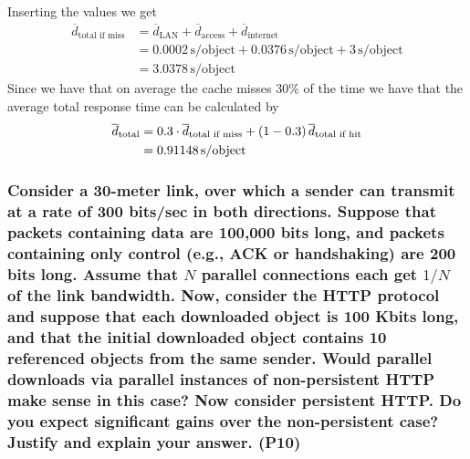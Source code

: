 Inserting the values we get
\begin{equation*}
\begin{split}
    \overline{d}_\text{total if miss} &= \overline{d}_\text{LAN} + \overline{d}_\text{access} + \overline{d}_\text{internet} \\
    &= 0.0002 \, \text{s/object} + 0.0376 \, \text{s/object} + 3 \, \text{s/object} \\
    &= 3.0378 \, \text{s/object}
\end{split}
\end{equation*}
Since we have that on average the cache misses 30\% of the time we have that the average total response time can be calculated by
\begin{equation*}
\begin{split}
    \overline{d}_\text{total} &= 0.3 \cdot \overline{d}_\text{total if miss}  + \left (1 - 0.3\right) \overline{d}_\text{total if hit} \\
    &= 0.91148 \, \text{s/object}
\end{split}
\end{equation*}


\subsubsection{Consider a 30-meter link, over which a sender can transmit at a rate of 300 bits/sec in both directions. Suppose that packets containing data are 100,000 bits long, and packets containing only control (e.g., ACK or handshaking) are 200 bits long. Assume that $N$ parallel connections each get $1/N$ of the link bandwidth. Now, consider the HTTP protocol and suppose that each downloaded object is 100 Kbits long, and that the initial downloaded object contains 10 referenced objects from the same sender. Would parallel downloads via parallel instances of non-persistent HTTP make sense in this case? Now consider persistent HTTP. Do you expect significant gains over the non-persistent case? Justify and explain your answer. (P10)}

